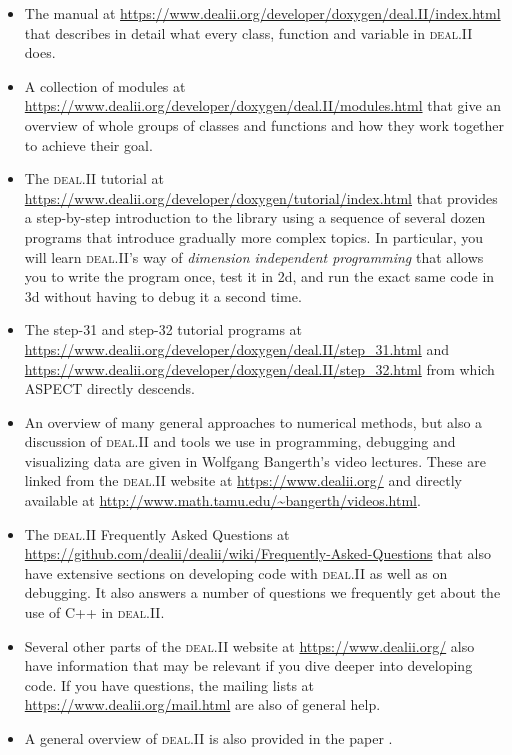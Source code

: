 \documentclass{article}
\newcommand{\dealii}{{\textsc{deal.II}}}
\newcommand{\aspect}{\textsc{ASPECT}}
\begin{document}
\begin{itemize}
\item The manual at
  \url{https://www.dealii.org/developer/doxygen/deal.II/index.html} that
  describes in detail what every class, function and variable in \dealii{}
  does.
\item A collection of modules at
  \url{https://www.dealii.org/developer/doxygen/deal.II/modules.html} that give
  an overview of whole groups of classes and functions and how they work
  together to achieve their goal.
\item The \dealii{} tutorial at
  \url{https://www.dealii.org/developer/doxygen/tutorial/index.html} that
  provides a step-by-step introduction to the library using a sequence of
  several dozen programs that introduce gradually more complex topics. In
  particular, you will learn \dealii's way of \textit{dimension independent
  programming} that allows you to write the program once, test it in 2d, and
  run the exact same code in 3d without having to debug it a second time.
\item The step-31 and step-32 tutorial programs at
  \url{https://www.dealii.org/developer/doxygen/deal.II/step_31.html} and
  \url{https://www.dealii.org/developer/doxygen/deal.II/step_32.html} from
  which \aspect{} directly descends.
\item An overview of many general approaches to numerical methods, but also
  a discussion of \dealii{} and tools we use in programming, debugging and
  visualizing data are given in Wolfgang Bangerth's video lectures. These
  are linked from the \dealii{} website at \url{https://www.dealii.org/}
  and directly available at
  \url{http://www.math.tamu.edu/~bangerth/videos.html}.
\item The \dealii{} Frequently Asked Questions at
  \url{https://github.com/dealii/dealii/wiki/Frequently-Asked-Questions}
  that also have extensive sections on developing code with \dealii{} as well
  as on debugging. It also answers a number of questions we frequently get
  about the use of C++ in \dealii{}.
\item Several other parts of the \dealii{} website at
  \url{https://www.dealii.org/} also have information that may be relevant if
  you dive deeper into developing code. If you have questions, the mailing
  lists at \url{https://www.dealii.org/mail.html} are also of general help.
\item A general overview of \dealii{} is also provided in the paper
  \cite{BHK07}.
\end{itemize}
\end{document}
